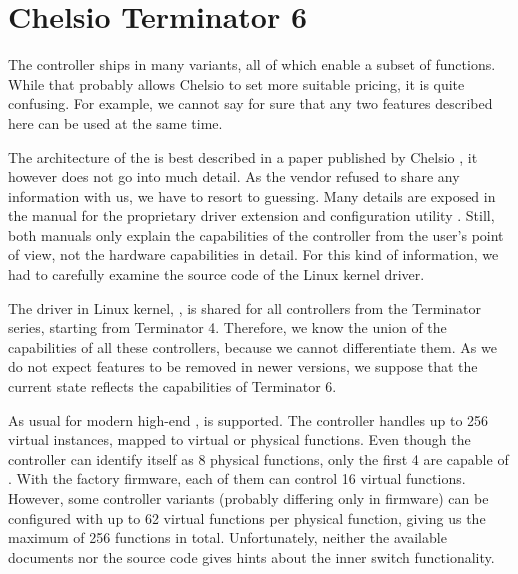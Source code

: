 \section{Chelsio Terminator 6}

% 
% 
% 
% 
% 
% 
% 
% 
% 
% 

The controller ships in many variants, all of which enable a subset of
functions. While that probably allows Chelsio to set more suitable pricing,
it is quite confusing. For example, we cannot say for sure that any two features
described here can be used at the same time.

The architecture of the  is best described in a paper published by
Chelsio \cite{chelsio-t6}, it however does not go into much detail. As the
vendor refused to share any information with us, we have to resort to guessing.
Many details are exposed in the manual for the proprietary driver extension
and configuration utility \cite{chelsio-uw}. Still, both manuals only
explain the capabilities of the controller from the user's point of view, not the
hardware capabilities in detail. For this kind of information, we had to
carefully examine the source code of the Linux kernel driver.

The driver in Linux kernel, , is shared for all controllers from the
Terminator series, starting from Terminator 4. Therefore, we know the union of
the capabilities of all these controllers, because we cannot differentiate
them. As we do not expect features to be removed in newer versions, we suppose
that the current state reflects the capabilities of Terminator 6.

As usual for modern high-end ,  is supported. The controller handles up
to 256 virtual instances, mapped to virtual or physical functions. Even though
the controller can identify itself as 8 physical functions, only the first
4 are capable of . With the factory firmware, each of them can
control 16 virtual functions. However, some controller variants (probably
differing only in firmware) can be configured with up to 62 virtual functions per
physical function, giving us the maximum of 256 functions in total. Unfortunately, neither
the available documents nor the source code gives hints about the inner switch
functionality.

